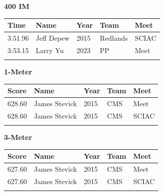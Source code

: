\vspace{1.2em}
\noindent\begin{minipage}[t]{0.98\textwidth}
\centering
\textbf{\textcolor{teamprimary}{400 IM}}\par
\vspace{0.5em}
\centering
\small
\renewcommand{\arraystretch}{1.0}
\setlength{\tabcolsep}{4pt}
\begin{tabular}{@{}p{2.5cm}p{4.5cm}p{1.5cm}p{2.5cm}p{2.5cm}@{}}
\toprule
\textbf{Time} & \textbf{Name} & \textbf{Year} & \textbf{Team} & \textbf{Meet} \\
\midrule
3:51.96 & Jeff Depew & 2015 & Redlands & SCIAC \\
3:53.15 & Larry Yu & 2023 & PP & Meet \\
\bottomrule
\vspace{0.5em}
\end{tabular}
\end{minipage}
\vspace{1.2em}
\noindent\begin{minipage}[t]{0.98\textwidth}
\centering
\textbf{\textcolor{teamprimary}{1-Meter}}\par
\vspace{0.5em}
\centering
\small
\renewcommand{\arraystretch}{1.0}
\setlength{\tabcolsep}{4pt}
\begin{tabular}{@{}p{2.5cm}p{4.5cm}p{1.5cm}p{2.5cm}p{2.5cm}@{}}
\toprule
\textbf{Score} & \textbf{Name} & \textbf{Year} & \textbf{Team} & \textbf{Meet} \\
\midrule
628.60 & James Stevick & 2015 & CMS & Meet \\
628.60 & James Stevick & 2015 & CMS & SCIAC \\
\bottomrule
\vspace{0.5em}
\end{tabular}
\end{minipage}
\vspace{1.2em}
\noindent\begin{minipage}[t]{0.98\textwidth}
\centering
\textbf{\textcolor{teamprimary}{3-Meter}}\par
\vspace{0.5em}
\centering
\small
\renewcommand{\arraystretch}{1.0}
\setlength{\tabcolsep}{4pt}
\begin{tabular}{@{}p{2.5cm}p{4.5cm}p{1.5cm}p{2.5cm}p{2.5cm}@{}}
\toprule
\textbf{Score} & \textbf{Name} & \textbf{Year} & \textbf{Team} & \textbf{Meet} \\
\midrule
627.60 & James Stevick & 2015 & CMS & Meet \\
627.60 & James Stevick & 2015 & CMS & SCIAC \\
\bottomrule
\vspace{0.5em}
\end{tabular}
\end{minipage}
